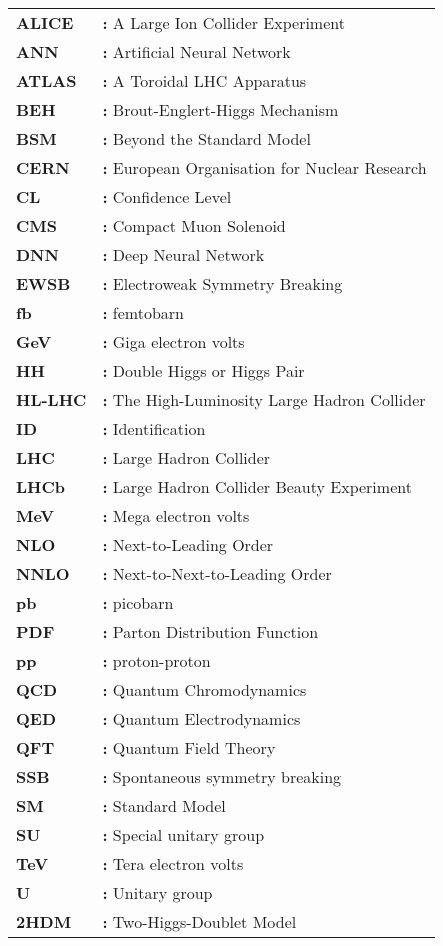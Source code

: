 \begin{tabular}{@{}p{2cm}l}
{\bf ALICE} & {\bf:} A Large Ion Collider Experiment\\
{\bf ANN} & {\bf:} Artificial Neural Network\\
{\bf ATLAS} & {\bf:} A Toroidal LHC Apparatus\\
{\bf BEH} & {\bf:} Brout-Englert-Higgs Mechanism\\
{\bf BSM} & {\bf:} Beyond the Standard Model\\
{\bf CERN} & {\bf:} European Organisation for Nuclear Research\\
{\bf CL} & {\bf:} Confidence Level\\
{\bf CMS} & {\bf:} Compact Muon Solenoid\\
{\bf DNN} & {\bf:} Deep Neural Network\\
{\bf EWSB} & {\bf:} Electroweak Symmetry Breaking\\
{\bf fb} & {\bf:} femtobarn\\
{\bf GeV} & {\bf:} Giga electron volts\\
{\bf HH} & {\bf:} Double Higgs or Higgs Pair\\
{\bf HL-LHC} & {\bf:} The High-Luminosity Large Hadron Collider\\
{\bf ID} & {\bf:} Identification\\
{\bf LHC} & {\bf:} Large Hadron Collider\\
{\bf LHCb} & {\bf:} Large Hadron Collider Beauty Experiment\\
{\bf MeV} & {\bf:} Mega electron volts\\
{\bf NLO} & {\bf:} Next-to-Leading Order\\
{\bf NNLO} & {\bf:} Next-to-Next-to-Leading Order\\
{\bf pb} & {\bf:} picobarn\\
{\bf PDF} & {\bf:} Parton Distribution Function\\
{\bf pp} & {\bf:} proton-proton\\
{\bf QCD} & {\bf:} Quantum Chromodynamics\\
{\bf QED} & {\bf:} Quantum Electrodynamics\\
{\bf QFT} & {\bf:} Quantum Field Theory\\
{\bf SSB} & {\bf:} Spontaneous symmetry breaking\\
{\bf SM} & {\bf:} Standard Model\\
{\bf SU} & {\bf:} Special unitary group\\
{\bf TeV} & {\bf:} Tera electron volts\\
{\bf U} & {\bf:} Unitary group\\
{\bf 2HDM} & {\bf:} Two-Higgs-Doublet Model\\
\end{tabular}

